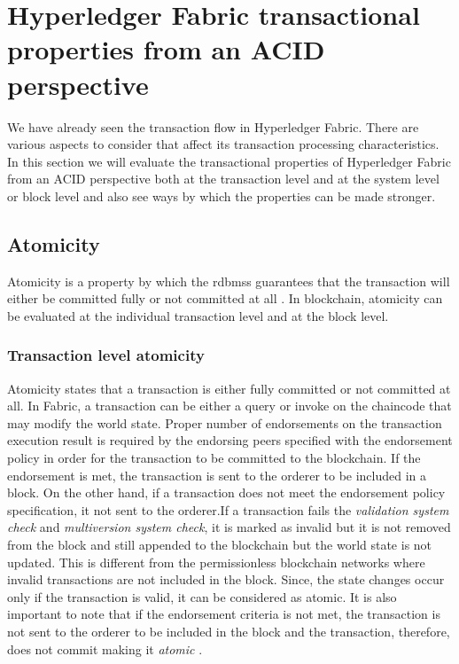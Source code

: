 \documentclass[
  a4paper,  %
  twoside,  %
  bibliography=totoc,
  headsepline,
  cleardoublepage=empty,
  parskip=half,
  draft=false
]{scrbook}
\begin{document}
\section{Hyperledger Fabric transactional properties from an ACID perspective}
We have already seen the transaction flow in Hyperledger Fabric. There are various aspects to consider that affect its transaction processing characteristics. In this section we will evaluate the transactional properties of Hyperledger Fabric from an ACID perspective both at the transaction level and at the system level or block level and also see ways by which the properties can be made stronger.

\subsection{Atomicity}
Atomicity is a property by which the \glspl{rdbms} guarantees that the transaction will either be committed fully or not committed at all \cite{Atomicity}. In blockchain, atomicity can be evaluated at the individual transaction level and at the block level.
\subsubsection{Transaction level atomicity}
Atomicity states that a transaction is either fully committed or not committed at all. In Fabric, a transaction can be either a query or invoke on the chaincode that may modify the world state. Proper number of endorsements on the transaction execution result is required by the endorsing peers specified with the endorsement policy in order for the transaction to be committed to the blockchain. If the endorsement is met, the transaction is sent to the orderer to be included in a block. On the other hand, if a transaction does not meet the endorsement policy specification, it not sent to the orderer.If a transaction fails the \textit{validation system check} and \textit{multiversion system check}, it is marked as invalid but it is not removed from the block and still appended to the blockchain but the world state is not updated. This is different from the permissionless blockchain networks where invalid transactions are not included in the block. Since, the state changes occur only if the transaction is valid, it can be considered as atomic. It is also important to note that if the endorsement criteria is not met, the transaction is not sent to the orderer to be included in the block and the transaction, therefore, does not commit making it \textit{atomic} \cite{HF}.
\end{document}
